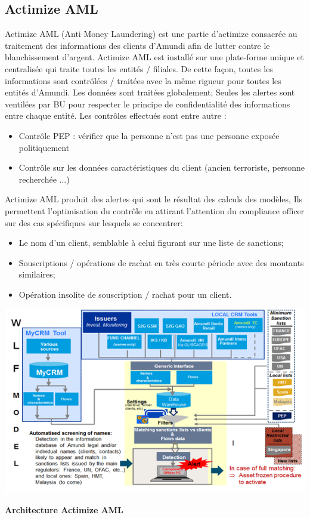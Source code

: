 \documentclass[12pt,a4paper]{report}
\begin{document}
\subsection{Actimize AML}
Actimize AML (Anti Money Laundering) est une partie d'actimize consacrée au traitement des informations des clients d'Amundi afin de lutter contre le blanchissement d'argent. 
Actimize AML est installé sur une plate-forme unique et centralisée qui traite toutes les entités / filiales. De cette façon, toutes les informations sont contrôlées / traitées avec la même rigueur pour toutes les entités d'Amundi. Les données sont traitées globalement; Seules les alertes sont ventilées par BU pour respecter le principe de confidentialité des informations entre chaque entité.\newline
Les contrôles effectués sont entre autre :
\begin{itemize}
   \item Contrôle PEP : vérifier que la personne n'est pas une personne exposée politiquement 
   \item Contrôle sur les données caractéristiques du client (ancien terroriste, personne recherchée ...)
\end{itemize}   
Actimize AML produit des alertes qui sont le résultat des calculs des modèles, Ils permettent l'optimisation du contrôle en attirant l'attention du compliance officer sur des cas spécifiques sur lesquels se concentrer:
\begin{itemize}
\item Le nom d'un client, semblable à celui figurant sur une liste de sanctions;
\item Souscriptions / opérations de rachat en très courte période avec des montants similaires;
\item Opération insolite de souscription / rachat pour un client.
\end{itemize}

\includegraphics[scale=1]{IMG/aml.png} 
\begin{center}
\textbf{Architecture Actimize AML}
\end{center} \vspace{0.3cm}
\end{document}
